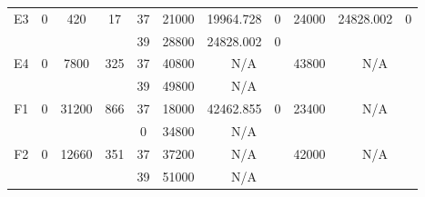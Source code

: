 \begin{sidewaystable}
\begin{tabular}{c||c|c|c||c|c|c|c||c|c|c}
         &
        
      \\
      \hline
      \multirow{2}{*}{E3} &
      \multirow{2}{*}{0} &
      \multirow{2}{*}{420} &
      \multirow{2}{*}{17} &
      37 &
      21000 &
        19964.728 &
        0 &
      \multirow{2}{*}{24000} &
        \multirow{2}{*}{24828.002} &
        \multirow{2}{*}{0}
      \\
      \cline{5-8}
       &
       &
       &
       &
      39 &
      28800 &
        24828.002 &
        0 &
      
         &
        
      \\
      \hline
      \multirow{2}{*}{E4} &
      \multirow{2}{*}{0} &
      \multirow{2}{*}{7800} &
      \multirow{2}{*}{325} &
      37 &
      40800 &
        \multicolumn{2}{|c||}{N/A} &
      \multirow{2}{*}{43800} &
        \multicolumn{2}{c}{\multirow{2}{*}{N/A}}
      \\
      \cline{5-8}
       &
       &
       &
       &
      39 &
      49800 &
        \multicolumn{2}{|c||}{N/A} &
      
        
      \\
      \hline
      \multirow{2}{*}{F1} &
      \multirow{2}{*}{0} &
      \multirow{2}{*}{31200} &
      \multirow{2}{*}{866} &
      37 &
      18000 &
        42462.855 &
        0 &
      \multirow{2}{*}{23400} &
        \multicolumn{2}{c}{\multirow{2}{*}{N/A}}
      \\
      \cline{5-8}
       &
       &
       &
       &
      0 &
      34800 &
        \multicolumn{2}{|c||}{N/A} &
      
        
      \\
      \hline
      \multirow{2}{*}{F2} &
      \multirow{2}{*}{0} &
      \multirow{2}{*}{12660} &
      \multirow{2}{*}{351} &
      37 &
      37200 &
        \multicolumn{2}{|c||}{N/A} &
      \multirow{2}{*}{42000} &
        \multicolumn{2}{c}{\multirow{2}{*}{N/A}}
      \\
      \cline{5-8}
       &
       &
       &
       &
      39 &
      51000 &
        \multicolumn{2}{|c||}{N/A} &
      
        
      \\
\end{tabular}
\label{table:RASDATASET3} 
\end{sidewaystable}